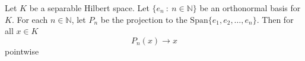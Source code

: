 \begin{remark}
  Let $K$ be a separable Hilbert space. Let $\{ e_n \ : \ n \in
  \mathbb{N} \}$ be an orthonormal basis for $K$. For each $n \in
  \mathbb{N}$, let $P_n$ be the projection to the $\textrm{Span}\{
  e_1 , e_2 , \ldots , e_n \}$. Then for all $ x \in K$ \[
    P_n(x) \to x
  \]
  pointwise
\end{remark}


